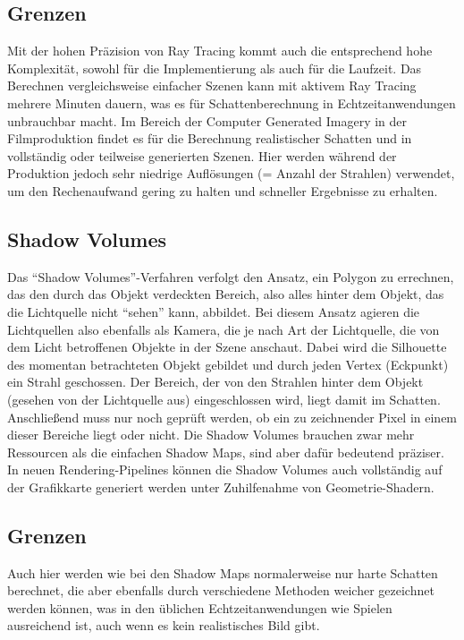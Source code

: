 \subsection*{Grenzen}

Mit der hohen Präzision von Ray Tracing kommt auch die entsprechend hohe Komplexität, sowohl für die
Implementierung als auch für die Laufzeit. Das Berechnen vergleichsweise einfacher Szenen kann mit
aktivem Ray Tracing mehrere Minuten dauern, was es für Schattenberechnung in Echtzeitanwendungen
unbrauchbar macht. Im Bereich der Computer Generated Imagery in der Filmproduktion findet es für die
Berechnung realistischer Schatten und in vollständig oder teilweise generierten Szenen. Hier werden
während der Produktion jedoch sehr niedrige Auflösungen (= Anzahl der Strahlen) verwendet, um den
Rechenaufwand gering zu halten und schneller Ergebnisse zu erhalten.

\subsection{Shadow Volumes}

Das "`Shadow Volumes"'-Verfahren verfolgt den Ansatz, ein Polygon zu errechnen, das den durch das
Objekt verdeckten Bereich, also alles hinter dem Objekt, das die Lichtquelle nicht "`sehen"' kann,
abbildet. Bei diesem Ansatz agieren die Lichtquellen also ebenfalls als
Kamera, die je nach Art der Lichtquelle, die von dem Licht betroffenen Objekte in der Szene anschaut.
Dabei wird die Silhouette des momentan betrachteten Objekt gebildet und durch jeden Vertex (Eckpunkt)
ein Strahl geschossen. Der Bereich, der von den Strahlen hinter dem Objekt (gesehen von der Lichtquelle
aus) eingeschlossen wird, liegt damit im Schatten. Anschließend muss nur noch geprüft werden, ob ein zu
zeichnender Pixel in einem dieser Bereiche liegt oder nicht. Die Shadow Volumes brauchen zwar mehr
Ressourcen als die einfachen Shadow Maps, sind aber dafür bedeutend präziser. In neuen Rendering-Pipelines
können die Shadow Volumes auch vollständig auf der Grafikkarte generiert werden unter Zuhilfenahme von
Geometrie-Shadern. \cite{shadowvol2014}

\subsection*{Grenzen}

Auch hier werden wie bei den Shadow Maps normalerweise nur harte Schatten berechnet, die aber ebenfalls
durch verschiedene Methoden weicher gezeichnet werden können, was in den üblichen Echtzeitanwendungen wie
Spielen ausreichend ist, auch wenn es kein realistisches Bild gibt.
